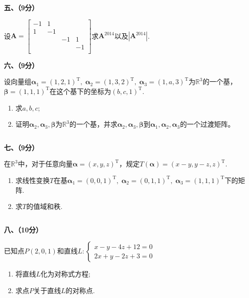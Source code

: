 \documentclass[11pt,a4paper]{ctexart}
\def\t{^\mathrm{T}}
\begin{document}
\begin{framed}
    \begin{large}
        \noindent\textbf{五、（9分）}
    \end{large}
    设\(\displaystyle\boldsymbol{A} = \begin{bmatrix}
        -1 & 1 & & \\ 1 & -1 & & \\ & & -1 & 1 \\ & & & -1\\
    \end{bmatrix}\)求\(\boldsymbol{A}^{2014}\)以及\(|\boldsymbol{A}^{2014}|\).\[\] \[\]\[\]\[\]\[\]\[\]\[\]\[\]\[\]\[\]

    \begin{large}
        \noindent\textbf{六、（9分）}
    \end{large}
    设向量组\(\boldsymbol{\alpha}_1 = (1, 2, 1)\t ,\; \boldsymbol{\alpha}_2 = (1, 3, 2) \t ,\; \boldsymbol{\alpha}_3 = (1, a, 3) \t \)为\(\mathbb{R}^3\)的一个基，\(\boldsymbol{\beta} = (1, 1, 1)\t \)在这个基下的坐标为\((b, c, 1)\t\).\begin{enumerate}
        \item 求\(a, b, c\);
        \item 证明\(\boldsymbol{\alpha}_2, \boldsymbol{\alpha}_3 , \boldsymbol{\beta}\)为\(\mathbb{R}^3\)的一个基，并求\(\boldsymbol{\alpha}_2, \boldsymbol{\alpha}_3, \boldsymbol{\beta}\)到\(\boldsymbol{\alpha}_1, \boldsymbol{\alpha}_2 , \boldsymbol{\alpha}_3\)的一个过渡矩阵。
    \end{enumerate}\[\] \[\]\[\]\[\]\[\]\[\]\[\]\[\]\[\]\[\]

    \begin{large}
        \noindent\textbf{七、（9分）}
    \end{large}
    在\(\mathbb{R}^3\)中，对于任意向量\(\boldsymbol{\alpha} = (x, y, z)\t\)，规定\(T(\boldsymbol{\alpha}) = (x - y, y - z, z) \t.\)\begin{enumerate}
        \item 求线性变换\(T\)在基\(\boldsymbol{\alpha}_1 = (0, 0, 1)\t, \; \boldsymbol{\alpha}_2 = (0, 1, 1)\t,\; \boldsymbol{\alpha}_3 = (1, 1, 1)\t\)下的矩阵.
        \item 求\(T\)的值域和秩.
    \end{enumerate}\[\] \[\]\[\]\[\]\[\]\[\]\[\]\[\]\[\]

    \begin{large}
        \noindent\textbf{八、（10分）}
    \end{large}
    已知点\(P(2, 0, 1)\)和直线\(L : \left\{\begin{aligned}
        x - y - 4z + 12 = 0 \\ 2x + y - 2z + 3 = 0
    \end{aligned}\right.\)
    \begin{enumerate}
        \item 将直线\(L\)化为对称式方程;
        \item 求点\(P\)关于直线\(L\)的对称点.
    \end{enumerate}\[\] \[\]\[\]\[\]\[\]\[\]\[\]\[\]\[\]


\end{framed}
\end{document}
